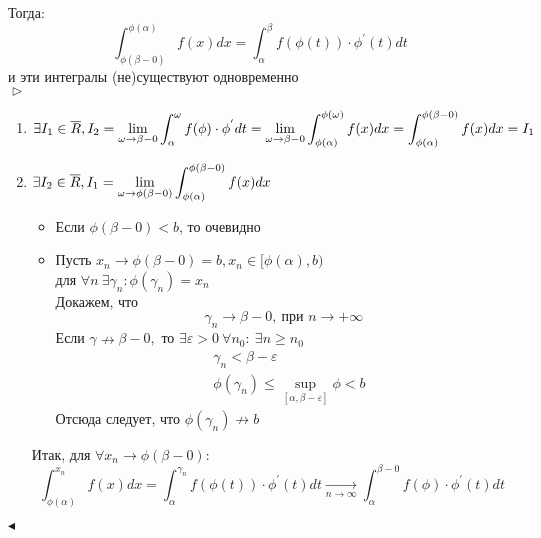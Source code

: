 \documentclass{article}
\newcommand*{\prooff}[1]{$\vartriangleright$ #1 $\blacktriangleleft$}
\begin{document}
\begin{enumerate}
{        Тогда:
        $$
            \int_{\phi(\beta-0)}^{\phi(\alpha)}f(x)dx = \int_{\alpha}^{\beta}f(\phi(t))\cdot \phi^{'}(t)dt
        $$
        и эти интегралы (не)существуют одновременно\\
        \prooff{
            \begin{enumerate}
                \item {
                    $\exists I_1 \in \overline{R},\\ I_2 = \displaystyle \lim_{\omega \to \beta - 0}\int_{\alpha}^{\omega} f(\phi)\cdot \phi^{'} dt = \displaystyle \lim_{\omega \to \beta - 0} \int_{\phi(\alpha)}^{\phi(\omega)}f(x)dx = \int_{\phi(\alpha)}^{\phi(\beta - 0)}f(x)dx = I_1$
                }
                \item {
                    $\exists I_2 \in \overline{R},\\ I_1 = \displaystyle \lim_{\omega \to \phi(\beta - 0)} \int_{\phi(\alpha)}^{\phi(\beta - 0)}f(x)dx$
                    \begin{itemize}
                        \item {
                            Если $\phi(\beta - 0) < b$, то очевидно
                        }
                        \item {
                            Пусть $x_n \to \phi(\beta - 0) = b, x_n \in [\phi(\alpha), b)$\\
                            для $\forall n\  \exists \gamma_n: \phi(\gamma_n) = x_n$\\
                            Докажем, что $$\gamma_n \to \beta - 0,\ \text{при } n \to +\infty$$
                            Если $\gamma \nrightarrow \beta - 0,$ то $\exists \varepsilon > 0\ \forall n_0:\  \exists n \geq n_0$
                            \begin{align*}
                                &\gamma_n < \beta - \varepsilon\\
                                &\phi(\gamma_n) \leq \sup_{[\alpha, \beta - \varepsilon]}\phi < b
                            \end{align*}
                            Отсюда следует, что $\phi(\gamma_n) \nrightarrow b$
                        }
                    \end{itemize}
                    Итак, для $\forall x_n \to \phi(\beta - 0):\ $
                    $$
                        \int_{\phi(\alpha)}^{x_n} f(x)dx = \int_{\alpha}^{\gamma_n} f(\phi(t))\cdot\phi^{'}(t)dt \xrightarrow[n \to \infty]{} \int_{\alpha}^{\beta - 0} f(\phi)\cdot\phi^{'}(t)dt
                    $$
                }
            \end{enumerate}
        } 
    }
\end{enumerate}
\end{document}
